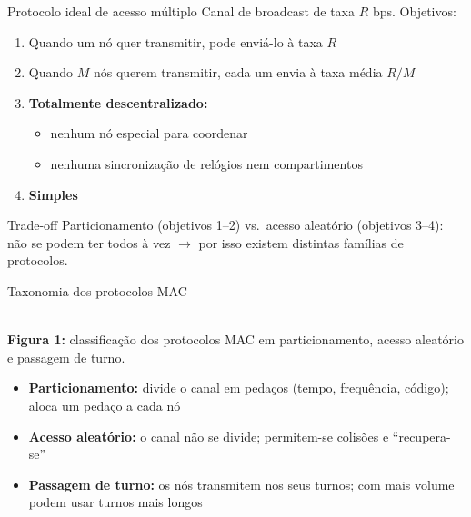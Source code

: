 \documentclass[aspectratio=169,11pt]{beamer}
\begin{document}
\begin{frame}{Protocolo ideal de acesso múltiplo}
  Canal de broadcast de taxa $R$ bps. Objetivos:
  \begin{enumerate}
    \item Quando um nó quer transmitir, pode enviá-lo à taxa $R$
    \item Quando $M$ nós querem transmitir, cada um envia à taxa média $R/M$
    \item \textbf{Totalmente descentralizado:}
      \begin{itemize}
        \item nenhum nó especial para coordenar
        \item nenhuma sincronização de relógios nem compartimentos
      \end{itemize}
    \item \textbf{Simples}
  \end{enumerate}
  \begin{alertblock}{Trade-off}
    Particionamento (objetivos 1--2) vs.\ acesso aleatório (objetivos 3--4): não se podem ter todos à vez $\rightarrow$ por isso existem distintas famílias de protocolos.
  \end{alertblock}
\end{frame}

\begin{frame}{Taxonomia dos protocolos MAC}
  \begin{center}
    \\[1mm]
    {\scriptsize \textbf{Figura 1:} classificação dos protocolos MAC em particionamento, acesso aleatório e passagem de turno.}
  \end{center}
  \begin{itemize}
    \item \textbf{Particionamento:} divide o canal em pedaços (tempo, frequência, código); aloca um pedaço a cada nó
    \item \textbf{Acesso aleatório:} o canal não se divide; permitem-se colisões e ``recupera-se''
    \item \textbf{Passagem de turno:} os nós transmitem nos seus turnos; com mais volume podem usar turnos mais longos
  \end{itemize}
\end{frame}
\end{document}
